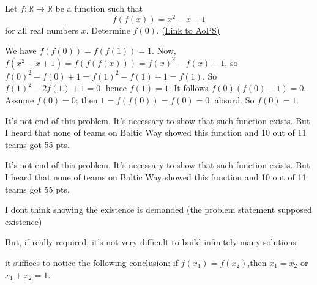 \begin{problem}
	Let $f:\mathbb{R}\to\mathbb{R}$ be a function such that
\[f(f(x))=x^2-x+1\]
for all real numbers $x$. Determine $f(0)$.
	\flushright \href{https://artofproblemsolving.com/community/c6h443695}{(Link to AoPS)}
\end{problem}



\begin{solution}
	We have $f(f(0)) = f(f(1)) = 1$.
Now, $f(x^2-x+1) = f(f(f(x))) = f(x)^2 - f(x) + 1$, so $f(0)^2 - f(0) + 1 = f(1)^2 - f(1) + 1 = f(1)$.
So $f(1)^2 - 2f(1) + 1 = 0$, hence $\boxed{f(1)=1}$. It follows $f(0)(f(0)-1) = 0$.
Assume $f(0) = 0$; then $1=f(f(0)) = f(0) = 0$, absurd. So $\boxed{f(0)=1}$.
\end{solution}



\begin{solution}
	It's not end of this problem. It's necessary to show that such function exists.
But I heard that none of teams on Baltic Way showed this function and 10 out of 11 teams got 5\/5 pts.
\end{solution}



\begin{solution}
	\begin{tcolorbox}It's not end of this problem. It's necessary to show that such function exists.
But I heard that none of teams on Baltic Way showed this function and 10 out of 11 teams got 5\/5 pts.\end{tcolorbox}

I dont think showing the existence is demanded (the problem statement supposed existence)

But, if really required,  it's not very difficult to build infinitely many solutions.
\end{solution}



\begin{solution}
	it suffices to notice the following conclusion:
if $f(x_1)=f(x_2)$,then $x_1=x_2$ or $x_1+x_2=1$.
\end{solution}



